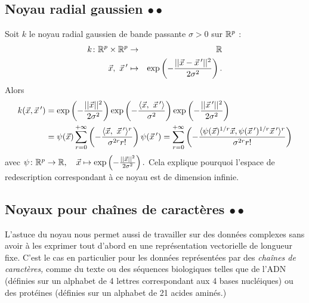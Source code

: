 \subsection{Noyau radial gaussien $\bullet \bullet$}
\label{sec:rbf_kernel}
Soit $k$ le noyau radial gaussien de bande passante $\sigma > 0$ sur $\mathbb{R}^p$ :
\begin{eqnarray*}
  k\colon \RR^p \times \RR^p & \to & \RR \\
  \xx,~\xx^\prime & \mapsto & \exp\left( - \frac{||\xx - \xx^\prime||^2}{2 \sigma^2} \right).
\end{eqnarray*}
Alors
\begin{align*}
  k(\xx, \xx^\prime) & = \exp\left( - \frac{||\xx||^2}{2 \sigma^2} \right)
                 \exp\left( - \frac{\innerproduct{\xx,~\xx^\prime}}{\sigma^2} \right)
                 \exp\left( - \frac{||\xx^\prime||^2}{2 \sigma^2} \right)  \\
               & = \psi(\xx) 
                 \sum_{r=0}^{+ \infty} 
                 \left( - \frac{\innerproduct{\xx,~ \xx^\prime}^r}{\sigma^{2r} r! } \right) \psi(\xx^\prime) 
    = \sum_{r=0}^{+ \infty} 
    \left( - \frac{\innerproduct{\psi(\xx)^{1/r} \xx, \psi(\xx^\prime)^{1/r} \xx^\prime}^r}{\sigma^{2r} r! } \right) 
\end{align*}
avec
$\psi\colon \RR^p \to \RR, \quad \xx \mapsto \exp\left( -\frac{||\xx||^2}{2
    \sigma^2} \right).$ Cela explique pourquoi l'espace de redescription
correspondant à ce noyau est de dimension infinie.

\subsection{Noyaux pour chaînes de caractères $\bullet \bullet$}
\label{sec:more_kernels}
L'astuce du noyau nous permet aussi de travailler sur des données complexes
sans avoir à les exprimer tout d'abord en une représentation vectorielle de
longueur fixe. C'est le cas en particulier pour les données représentées par
des {\it chaînes de caractères,} comme du texte ou des séquences biologiques
telles que de l'ADN (définies sur un alphabet de 4 lettres correspondant aux 4
bases nucléiques) ou des protéines (définies sur un alphabet de 21 acides
aminés.)
  
